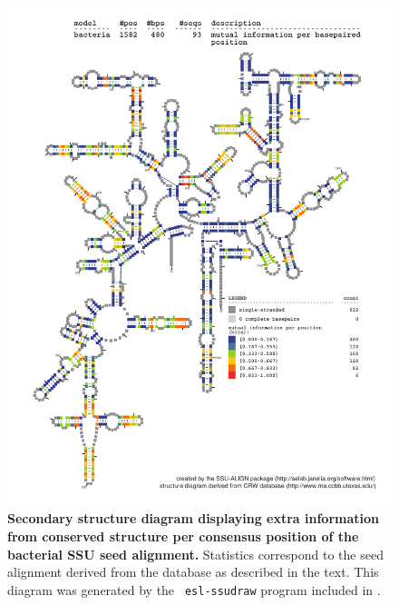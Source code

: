 \begin{figure}
\begin{center}
\includegraphics[width=5.7in]{Figures/bacteria-0p1-mutinfo}
\end{center}
\caption[Secondary structure diagram displaying extra information 
  from conserved structure per consensus position of the bacterial SSU seed
  alignment]{\textbf{Secondary structure diagram displaying extra
  information from conserved structure per consensus position of the bacterial SSU seed
  alignment.} Statistics correspond to the  seed
  alignment derived from the  database \cite{CannoneGutell02}
  as described in the text. This diagram was generated by the {\tt
  esl-ssudraw} program included in .}
\label{fig:bacsinfo}
\end{figure}


